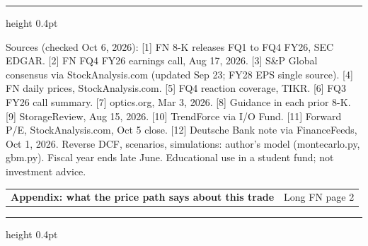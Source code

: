 \documentclass[9pt,letterpaper]{extarticle}
\begin{document}
\vspace{-4pt}
{\color{rule}\hrule height 0.4pt}
\vspace{2pt}
{\scriptsize\color{black!70}
Sources (checked Oct 6, 2026): [1] FN 8-K releases FQ1 to FQ4 FY26, SEC EDGAR. [2] FN FQ4 FY26 earnings call, Aug 17, 2026. [3] S\&P Global consensus via StockAnalysis.com (updated Sep 23; FY28 EPS single source). [4] FN daily prices, StockAnalysis.com. [5] FQ4 reaction coverage, TIKR. [6] FQ3 FY26 call summary. [7] optics.org, Mar 3, 2026. [8] Guidance in each prior 8-K. [9] StorageReview, Aug 15, 2026. [10] TrendForce via I/O Fund. [11] Forward P/E, StockAnalysis.com, Oct 5 close. [12] Deutsche Bank note via FinanceFeeds, Oct 1, 2026. Reverse DCF, scenarios, simulations: author's model (montecarlo.py, gbm.py). Fiscal year ends late June. Educational use in a student fund; not investment advice.\par}

\newpage
{\sffamily
\begin{tabularx}{\textwidth}{@{}X r@{}}
{\Large\bfseries\color{navy} Appendix: what the price path says about this trade} & {\small Long FN \textbar{} page 2}
\end{tabularx}}
\vspace{1pt}
{\color{rule}\hrule height 0.4pt}
\vspace{5pt}
 
\end{document}
